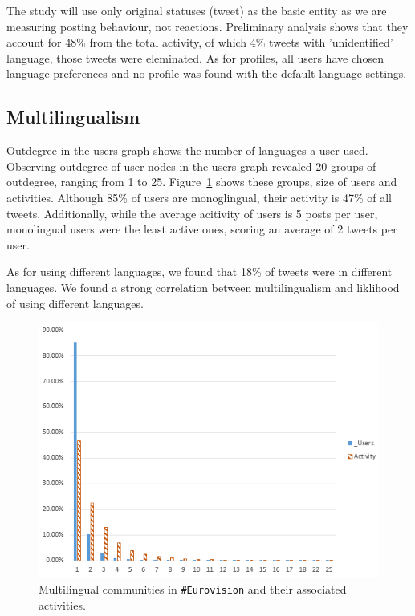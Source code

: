 \documentclass{llncs}
\begin{document}

The study will use only original statuses (tweet) as the basic entity as
we are measuring posting behaviour, not reactions. Preliminary analysis shows 
that they account for 48\% from the total activity, of which 4\% tweets with 
'unidentified' language, those tweets were eleminated. As for profiles, all users 
have chosen language preferences and no profile was found with the default
language settings.


\subsection{Multilingualism}
Outdegree in the users graph shows the number of languages a user used. 
Observing outdegree of user nodes in the users graph revealed 
20 groups of outdegree, ranging from 1 to 25. Figure~\ref{fig:multilingual} 
shows these groups, size of users and activities. Although 85\% of users are monoglingual,
their activity is 47\% of all tweets. Additionally, while the average acitivity of users is 5 posts
per user, monolingual users were the least active ones, scoring an average of 2 
tweets per user. 

As for using different languages, we found that 18\% of tweets were in different languages. 
We found a strong correlation between multilingualism
and liklihood of using different languages. 
\begin{figure}[htb]
\centering
\includegraphics[width=0.6\columnwidth]{images/multilingualcommunities.png}
\caption{Multilingual communities in {\texttt{\#Eurovision}} and their associated activities.}
\label{fig:multilingual}
\end{figure}
\end{document}
